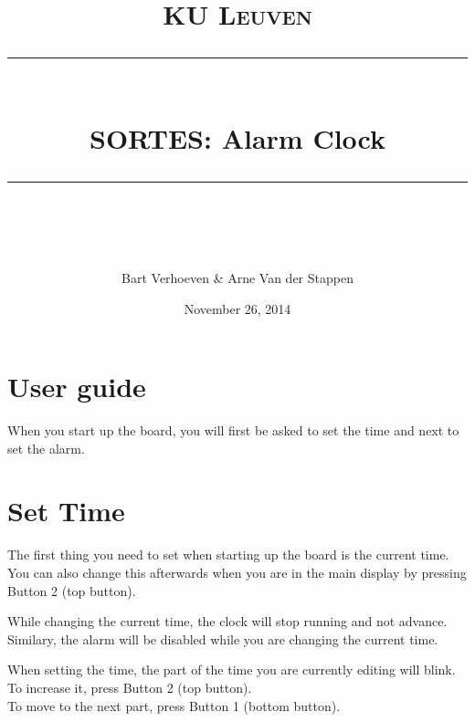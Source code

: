 \documentclass[11pt,a4paper]{scrartcl}
\begin{document}
\lstset{language=Prolog,basicstyle=\footnotesize}
\renewcommand\lstlistingname{Code}
\DeclarePairedDelimiter{\ceil}{\lceil}{\rceil}

\newcommand{\horrule}[1]{\rule{\linewidth}{#1}} %

\title{
\normalfont \normalsize
\textsc{KU Leuven} \\ [25pt] %
\horrule{0.5pt} \\[0.4cm] %
\huge SORTES: Alarm Clock \\ %
\horrule{2pt} \\[0.5cm] %
}
 
\author{Bart Verhoeven \& Arne Van der Stappen} %
 
\date{\normalsize November 26, 2014} %
 
\maketitle %

\tableofcontents

\newpage

\section{User guide \label{sec:userguide}}
When you start up the board, you will first be asked to set the time and next to set the alarm.

\section{Set Time}
The first thing you need to set when starting up the board is the current time.\\
You can also change this afterwards when you are in the main display by pressing Button 2 (top button).

While changing the current time, the clock will stop running and not advance.\\
Similary, the alarm will be disabled while you are changing the current time.

When setting the time, the part of the time you are currently editing will blink.\\
To increase it, press Button 2 (top button).\\
To move to the next part, press Button 1 (bottom button).
\end{document}

